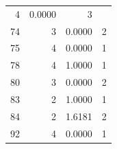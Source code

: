 \documentclass[12pt]{diazessay} %
\begin{document}
\begin{table}[b]
\begin{tabular}{r|r|r|r}
4 &             0.0000 &          3 \\       74 &           3 &             0.0000 &          2 \\       75 &           4 &             0.0000 &          1 \\       78 &           4 &             1.0000 &          1 \\       80 &           3 &             0.0000 &          2 \\       83 &           2 &             1.0000 &          1 \\       84 &           2 &             1.6181 &          2 \\       92 &           4 &             0.0000 &          1 \\ 
\end{tabular}
\end{table}
\end{document}
